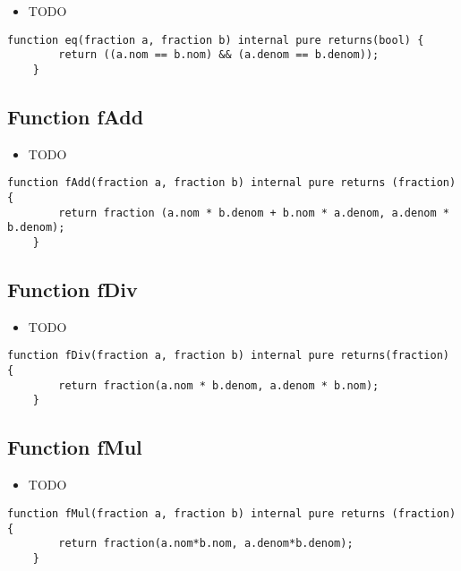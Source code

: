 \noindent\begin{itemize}
\item TODO
\end{itemize}

\begin{lstlisting}[firstnumber=53]
    function eq(fraction a, fraction b) internal pure returns(bool) {
        return ((a.nom == b.nom) && (a.denom == b.denom));
    }
\end{lstlisting}

\subsection{Function fAdd}

\noindent\begin{itemize}
\item TODO
\end{itemize}

\begin{lstlisting}[firstnumber=33]
    function fAdd(fraction a, fraction b) internal pure returns (fraction) {
        return fraction (a.nom * b.denom + b.nom * a.denom, a.denom * b.denom);
    }
\end{lstlisting}

\subsection{Function fDiv}

\noindent\begin{itemize}
\item TODO
\end{itemize}

\begin{lstlisting}[firstnumber=29]
    function fDiv(fraction a, fraction b) internal pure returns(fraction) {
        return fraction(a.nom * b.denom, a.denom * b.nom);
    }
\end{lstlisting}

\subsection{Function fMul}

\noindent\begin{itemize}
\item TODO
\end{itemize}

\begin{lstlisting}[firstnumber=17]
    function fMul(fraction a, fraction b) internal pure returns (fraction) {
        return fraction(a.nom*b.nom, a.denom*b.denom);
    }
\end{lstlisting}


